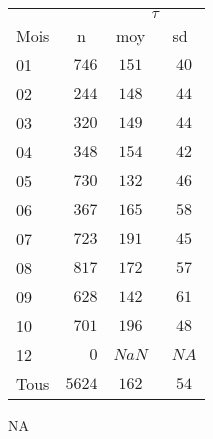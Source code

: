 \begin{table}[htbp]
\begin{center}
\begin{tabular}{lccc}
\hline
 &  & \multicolumn{2}{c}{$\tau$} \\ 
Mois  & n & moy & \multicolumn{1}{c}{sd} \\ 
\hline
01  & $\phantom{0}746$ & $151$ & $\phantom{0}40$ \\
02  & $\phantom{0}244$ & $148$ & $\phantom{0}44$ \\
03  & $\phantom{0}320$ & $149$ & $\phantom{0}44$ \\
04  & $\phantom{0}348$ & $154$ & $\phantom{0}42$ \\
05  & $\phantom{0}730$ & $132$ & $\phantom{0}46$ \\
06  & $\phantom{0}367$ & $165$ & $\phantom{0}58$ \\
07  & $\phantom{0}723$ & $191$ & $\phantom{0}45$ \\
08  & $\phantom{0}817$ & $172$ & $\phantom{0}57$ \\
09  & $\phantom{0}628$ & $142$ & $\phantom{0}61$ \\
10  & $\phantom{0}701$ & $196$ & $\phantom{0}48$ \\
12  & $\phantom{000}0$ & $NaN$ & $\phantom{0}NA$ \\
Tous  & $5624$ & $162$ & $\phantom{0}54$ \\
\hline 
\end{tabular}
\label{summary_taille_yellow}
NA
\end{center}
\end{table}
